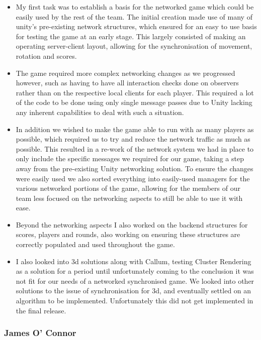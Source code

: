 \documentclass[11pt,a4paper]{article}
\begin{document}
        \begin{itemize}
          \item My first task was to establish a basis for the networked game which could be easily used by the rest of the team. The initial creation made use of many of unity’s pre-existing network structures, which ensured for an easy to use basis for testing the game at an early stage. This largely consisted of making an operating server-client layout, allowing for the synchronisation of movement, rotation and scores.

          \item The game required more complex networking changes as we progressed however, such as having to have all interaction checks done on observers rather than on the respective local clients for each player. This required a lot of the code to be done using only single message passes due to Unity lacking any inherent capabilities to deal with such a situation.

          \item In addition we wished to make the game able to run with as many players as possible, which required us to try and reduce the network traffic as much as possible. This resulted in a re-work of the network system we had in place to only include the specific messages we required for our game, taking a step away from the pre-existing Unity networking solution. To ensure the changes were easily used we also sorted everything into easily-used managers for the various networked portions of the game, allowing for the members of our team less focused on the networking aspects to still be able to use it with ease.

          \item Beyond the networking aspects I also worked on the backend structures for scores, players and rounds, also working on ensuring these structures are correctly populated and used throughout the game.

          \item I also looked into 3d solutions along with Callum, testing Cluster Rendering as a solution for a period until unfortunately coming to the conclusion it was not fit for our needs of a networked synchronised game. We looked into other solutions to the issue of synchronisation for 3d, and eventually settled on an algorithm to be implemented. Unfortunately this did not get implemented in the final release.
        \end{itemize}

        \subsubsection{James O’ Connor}
\end{document}
